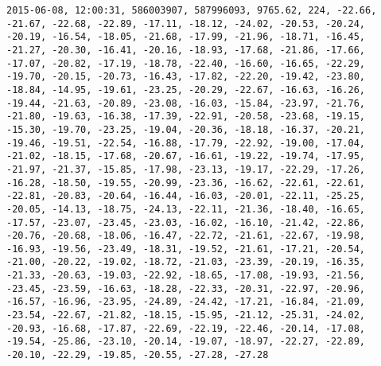 \begin{lstlisting}
2015-06-08, 12:00:31, 586003907, 587996093, 9765.62, 224, -22.66, -21.67, -22.68, -22.89, -17.11, -18.12, -24.02, -20.53, -20.24, -20.19, -16.54, -18.05, -21.68, -17.99, -21.96, -18.71, -16.45, -21.27, -20.30, -16.41, -20.16, -18.93, -17.68, -21.86, -17.66, -17.07, -20.82, -17.19, -18.78, -22.40, -16.60, -16.65, -22.29, -19.70, -20.15, -20.73, -16.43, -17.82, -22.20, -19.42, -23.80, -18.84, -14.95, -19.61, -23.25, -20.29, -22.67, -16.63, -16.26, -19.44, -21.63, -20.89, -23.08, -16.03, -15.84, -23.97, -21.76, -21.80, -19.63, -16.38, -17.39, -22.91, -20.58, -23.68, -19.15, -15.30, -19.70, -23.25, -19.04, -20.36, -18.18, -16.37, -20.21, -19.46, -19.51, -22.54, -16.88, -17.79, -22.92, -19.00, -17.04, -21.02, -18.15, -17.68, -20.67, -16.61, -19.22, -19.74, -17.95, -21.97, -21.37, -15.85, -17.98, -23.13, -19.17, -22.29, -17.26, -16.28, -18.50, -19.55, -20.99, -23.36, -16.62, -22.61, -22.61, -22.81, -20.83, -20.64, -16.44, -16.03, -20.01, -22.11, -25.25, -20.05, -14.13, -18.75, -24.13, -22.11, -21.36, -18.40, -16.65, -17.57, -23.07, -23.45, -23.03, -16.02, -16.10, -21.42, -22.86, -20.76, -20.68, -18.06, -16.47, -22.72, -21.61, -22.67, -19.98, -16.93, -19.56, -23.49, -18.31, -19.52, -21.61, -17.21, -20.54, -21.00, -20.22, -19.02, -18.72, -21.03, -23.39, -20.19, -16.35, -21.33, -20.63, -19.03, -22.92, -18.65, -17.08, -19.93, -21.56, -23.45, -23.59, -16.63, -18.28, -22.33, -20.31, -22.97, -20.96, -16.57, -16.96, -23.95, -24.89, -24.42, -17.21, -16.84, -21.09, -23.54, -22.67, -21.82, -18.15, -15.95, -21.12, -25.31, -24.02, -20.93, -16.68, -17.87, -22.69, -22.19, -22.46, -20.14, -17.08, -19.54, -25.86, -23.10, -20.14, -19.07, -18.97, -22.27, -22.89, -20.10, -22.29, -19.85, -20.55, -27.28, -27.28

\end{lstlisting}
